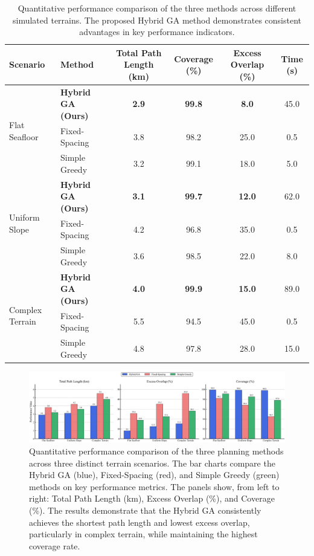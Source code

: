 \documentclass[compress]{cm}
\begin{document}
\begin{table}[H]
	\centering
	\caption{Quantitative performance comparison of the three methods across different simulated terrains. The proposed Hybrid GA method demonstrates consistent advantages in key performance indicators.}
	\label{tab:table2}
	\footnotesize
	\renewcommand{\arraystretch}{1.2}
	\begin{tabular}{@{}llcccc@{}}
		\toprule[1bp]
		\textbf{Scenario} & \textbf{Method} & \textbf{Total Path Length (km)} & \textbf{Coverage (\%)} & \textbf{Excess Overlap (\%)} & \textbf{Time (s)} \\
		\midrule[1bp]
		\multirow{3}{*}{Flat Seafloor} & \textbf{Hybrid GA (Ours)} & \textbf{2.9} & \textbf{99.8} & \textbf{8.0} & 45.0 \\
		& Fixed-Spacing & 3.8 & 98.2 & 25.0 & 0.5 \\
		& Simple Greedy & 3.2 & 99.1 & 18.0 & 5.0 \\
		\midrule[1bp]
		\multirow{3}{*}{Uniform Slope} & \textbf{Hybrid GA (Ours)} & \textbf{3.1} & \textbf{99.7} & \textbf{12.0} & 62.0 \\
		& Fixed-Spacing & 4.2 & 96.8 & 35.0 & 0.5 \\
		& Simple Greedy & 3.6 & 98.5 & 22.0 & 8.0 \\
		\midrule[1bp]
		\multirow{3}{*}{Complex Terrain} & \textbf{Hybrid GA (Ours)} & \textbf{4.0} & \textbf{99.9} & \textbf{15.0} & 89.0 \\
		& Fixed-Spacing & 5.5 & 94.5 & 45.0 & 0.5 \\
		& Simple Greedy & 4.8 & 97.8 & 28.0 & 15.0 \\
		\bottomrule[1bp]
	\end{tabular}
\end{table}

\begin{figure}[H]
	\centering
	\includegraphics[width=\textwidth]{pic/3.png}
	\caption{Quantitative performance comparison of the three planning methods across three distinct terrain scenarios. The bar charts compare the Hybrid GA (blue), Fixed-Spacing (red), and Simple Greedy (green) methods on key performance metrics. The panels show, from left to right: Total Path Length (km), Excess Overlap (\%), and Coverage (\%). The results demonstrate that the Hybrid GA consistently achieves the shortest path length and lowest excess overlap, particularly in complex terrain, while maintaining the highest coverage rate.}
	\label{fig:results}
\end{figure}
\end{document}
